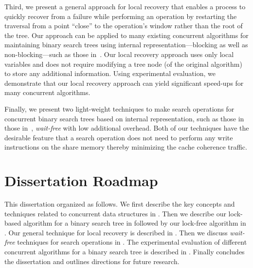 Third, we present a general approach for local recovery that enables a process to quickly recover from a failure while performing an operation by restarting the traversal from a point ``close'' to the operation's window rather than the root of the tree.  Our approach can be applied to many existing concurrent algorithms for maintaining binary search trees using internal representation---blocking as well as non-blocking---such as those in~\cite{HowJon:2012:SPAA,DraVec+:2014:PPoPP,ArbAtt:2014:PODC,RamMit:2015:PPoPP}. Our local recovery approach uses only local variables and does not require modifying a tree node (of the original algorithm) to store any additional information. Using experimental evaluation, we demonstrate that our local recovery approach can yield significant speed-ups for many concurrent algorithms.

Finally, we present two light-weight techniques to make search operations for concurrent binary search trees based on internal representation, such as those in those in~\cite{HowJon:2012:SPAA,DraVec+:2014:PPoPP,ArbAtt:2014:PODC,RamMit:2015:ICDCN,RamMit:2015:PPoPP}, \emph{wait-free} with low additional overhead. Both of our techniques have the desirable feature that a search operation does not need to perform any write instructions on the share memory thereby minimizing the cache coherence traffic.

\section{Dissertation Roadmap} 
This dissertation organized as follows. We first describe the key concepts and techniques related to concurrent data structures in \chapterref{\preliminaries}. Then we describe our lock-based algorithm for a binary search tree in  followed by our lock-free algorithm in . Our general technique for local recovery is described in . Then we discuss \emph{wait-free} techniques for search operations in . The experimental evaluation of different concurrent algorithms for a binary search tree is described in . Finally  concludes the dissertation and outlines directions for future research.